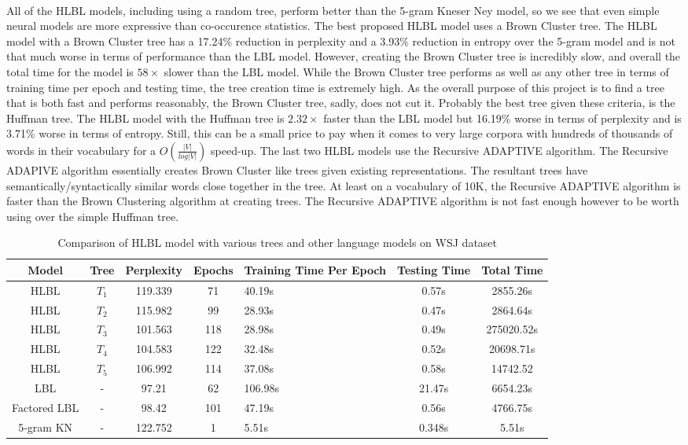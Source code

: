 \paragraph{}
All of the HLBL models, including using a random tree, perform better than the 5-gram Kneser Ney model,  so we see that even simple neural models are more expressive than co-occurence statistics. The best proposed HLBL model uses a Brown Cluster tree. The HLBL model with a Brown Cluster tree has a 17.24\% reduction in perplexity and a 3.93\% reduction in entropy over the 5-gram model and is not that much worse in terms of performance than the LBL model. However, creating the Brown Cluster tree is incredibly slow, and overall the total time for the model is $58\times$ slower than the LBL model. While the Brown Cluster tree performs as well as any other tree in terms of training time per epoch and testing time, the tree creation time is extremely high. As the overall purpose of this project is to find a tree that is both fast and performs reasonably, the Brown Cluster tree, sadly, does not cut it. Probably the best tree given these criteria, is the Huffman tree. The HLBL model with the Huffman tree is $2.32\times$ faster than the LBL model but 16.19\% worse in terms of perplexity and is 3.71\% worse in terms of entropy. Still, this can be a small price to pay when it comes to very large corpora with hundreds of thousands of words in their vocabulary for a $O(\frac{|V|}{log|V|})$ speed-up. The last two HLBL models use the Recursive ADAPTIVE algorithm. The Recursive ADAPIVE algorithm essentially creates Brown Cluster like trees given existing representations. The resultant trees have semantically/syntactically similar words close together in the tree. At least on a vocabulary of 10K, the Recursive ADAPTIVE algorithm is faster than the Brown Clustering algorithm at creating trees. The Recursive ADAPTIVE algorithm is not fast enough however to be worth using over the simple Huffman tree. 

\begin{table*} \centering
{}
\begin{tabular}{@{}ccccC{2cm}cc@{}}\toprule
Model & Tree & Perplexity & Epochs & Training Time Per Epoch & Testing Time & Total Time\\ 
\midrule
 HLBL & $T_1$ &119.339 & 71& 40.19s & 0.57s& 2855.26s\\
 HLBL & $T_2$ &115.982 & 99& 28.93s & 0.47s & 2864.64s\\
 HLBL & $T_3$ &101.563 & 118& 28.98s & 0.49s & 275020.52s \\
 HLBL & $T_4$ &104.583 & 122& 32.48s & 0.52s & 20698.71s\\
 HLBL & $T_5$ &106.992 & 114& 37.08s & 0.58s& 14742.52\\
 LBL& - &97.21 &62 &106.98s & 21.47s& 6654.23s\\
 Factored LBL & - &98.42&101 & 47.19s & 0.56s & 4766.75s \\
 5-gram KN & - &122.752& 1 & 5.51s & 0.348s & 5.51s\\
\bottomrule
\end{tabular}
\caption{Comparison of HLBL model with various trees and other language models on WSJ dataset}
\label{tab:languageModelComparison}
\end{table*}


